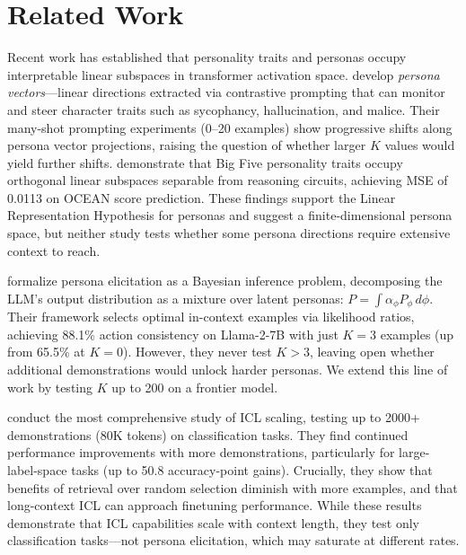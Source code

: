 \section{Related Work}
\label{sec:related}

Recent work has established that personality traits and personas occupy interpretable linear subspaces in transformer activation space. \citet{chen2025personavectors} develop \emph{persona vectors}---linear directions extracted via contrastive prompting that can monitor and steer character traits such as sycophancy, hallucination, and malice. Their many-shot prompting experiments (0--20 examples) show progressive shifts along persona vector projections, raising the question of whether larger $K$ values would yield further shifts. \citet{wang2025geometry} demonstrate that Big Five personality traits occupy orthogonal linear subspaces separable from reasoning circuits, achieving MSE of 0.0113 on OCEAN score prediction. These findings support the Linear Representation Hypothesis for personas and suggest a finite-dimensional persona space, but neither study tests whether some persona directions require extensive context to reach.

\citet{choi2024picle} formalize persona elicitation as a Bayesian inference problem, decomposing the LLM's output distribution as a mixture over latent personas: $P = \int \alpha_\phi P_\phi \, d\phi$. Their \picle framework selects optimal in-context examples via likelihood ratios, achieving 88.1\% action consistency on Llama-2-7B with just $K{=}3$ examples (up from 65.5\% at $K{=}0$). However, they never test $K > 3$, leaving open whether additional demonstrations would unlock harder personas. We extend this line of work by testing $K$ up to 200 on a frontier model.

\citet{bertsch2024longcontext} conduct the most comprehensive study of ICL scaling, testing up to 2000+ demonstrations (80K tokens) on classification tasks. They find continued performance improvements with more demonstrations, particularly for large-label-space tasks (up to 50.8 accuracy-point gains). Crucially, they show that benefits of retrieval over random selection diminish with more examples, and that long-context ICL can approach finetuning performance. While these results demonstrate that ICL capabilities scale with context length, they test only classification tasks---not persona elicitation, which may saturate at different rates.

